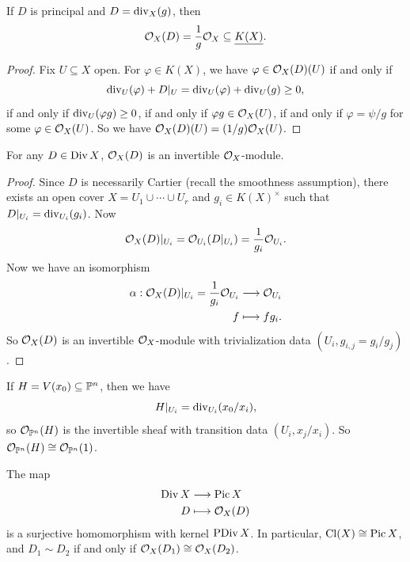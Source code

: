 \begin{prop}
  If $D$ is principal and
  $D = \operatorname{div}_X(g)$, then
  \[
    \mathcal{O}_X(D) = \frac{1}{g} \mathcal{O}_X
    \subseteq \underline{K(X)}.
  \]
\end{prop}

\begin{proof}
  Fix $U \subseteq X$ open. For
  $\varphi \in K(X)$, we have
  $\varphi \in \mathcal{O}_X(D)(U)$ if and only if
  \[
    \operatorname{div}_U(\varphi)
    + D|_U
    = \operatorname{div}_U(\varphi) + \operatorname{div}_U(g)
    \ge 0,
  \]
  if and only if $\operatorname{div}_U(\varphi g) \ge 0$,
  if and only if $\varphi g \in \mathcal{O}_X(U)$,
  if and only if $\varphi = \psi / g$ for
  some $\varphi \in \mathcal{O}_X(U)$.
  So we have
  $\mathcal{O}_X(D)(U) = (1 / g) \mathcal{O}_X(U)$.
\end{proof}

\begin{corollary}
  For any $D \in \operatorname{Div} X$, $\mathcal{O}_X(D)$ is an
  invertible $\mathcal{O}_X$-module.
\end{corollary}

\begin{proof}
  Since $D$ is necessarily Cartier (recall
  the smoothness assumption),
  there exists an open cover
  $X = U_1 \cup \cdots \cup U_r$
  and $g_i \in K(X)^\times$ such that
  $D|_{U_i} = \operatorname{div}_{U_i}(g_i)$. Now
  \[
    \mathcal{O}_X(D)|_{U_i}
    = \mathcal{O}_{U_i}(D|_{U_i})
    = \frac{1}{g_i} \mathcal{O}_{U_i}.
  \]
  Now we have an isomorphism
  \begin{align*}
    \alpha : \mathcal{O}_X(D)|_{U_i}
    = \frac{1}{g_i} \mathcal{O}_{U_i}
    &\longrightarrow \mathcal{O}_{U_i} \\
    f &\longmapsto f g_i.
  \end{align*}
  So $\mathcal{O}_X(D)$ is an invertible
  $\mathcal{O}_X$-module with trivialization
  data $(U_i, g_{i, j} = g_i / g_j)$.
\end{proof}

\begin{example}
  If $H = V(x_0) \subseteq \mathbb{P}^n$, then we
  have
  \[
    H|_{U_i} = \operatorname{div}_{U_i}(x_0 / x_i),
  \]
  so $\mathcal{O}_{\mathbb{P}^n}(H)$ is the invertible
  sheaf with transition data
  $(U_i, x_j / x_i)$.
  So $\mathcal{O}_{\mathbb{P}^n}(H) \cong \mathcal{O}_{\mathbb{P}^n}(1)$.
\end{example}

\begin{prop}\label{prop:divisor-invertible-sheaf}
  The map
  \begin{align*}
    \operatorname{Div} X &\longrightarrow \operatorname{Pic} X \\
    D &\longmapsto \mathcal{O}_X(D)
  \end{align*}
  is a surjective homomorphism
  with kernel $\operatorname{PDiv} X$.
  In particular, $\operatorname{Cl}(X) \cong \operatorname{Pic} X$, and
  $D_1 \sim D_2$ if and only if
  $\mathcal{O}_X(D_1) \cong \mathcal{O}_X(D_2)$.
\end{prop}

